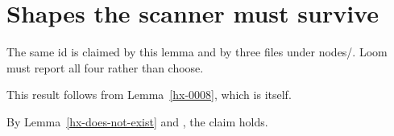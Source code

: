 \section{Shapes the scanner must survive}\label{hx-0400}





\begin{lemma}\label{hx-0007}
The same id is claimed by this lemma and by three files under nodes/. Loom must report all four rather than choose.
\end{lemma}


\begin{lemma}\label{hx-0008}
This result follows from Lemma~\ref{hx-0008}, which is itself. 
\end{lemma}

\begin{lemma}\label{hx-0009}
By Lemma~\ref{hx-does-not-exist} and \cite[Theorem 9]{NoSuchWork}, the claim holds. 
\end{lemma}
